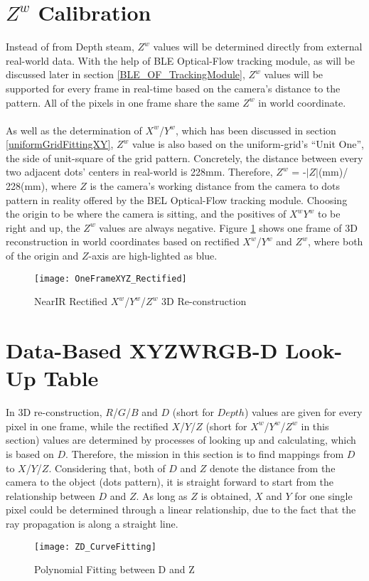 \section{\(Z^{w}\) Calibration}
\label{finalDataBasedModelReconstruction}
%
Instead of from Depth steam, \(Z^{w}\) values will be determined directly from external real-world data. With the help of BLE Optical-Flow tracking module, as will be discussed later in section \ref{BLE_OF_TrackingModule}, \(Z^{w}\) values will be supported for every frame in real-time based on the camera's distance to the pattern. All of the pixels in one frame share the same \(Z^{w}\) in world coordinate.%
\\\\%
As well as the determination of \(X^{w}\)/\(Y^{w}\), which has been discussed in section \ref{uniformGridFittingXY},  \(Z^{w}\) value is also based on the uniform-grid's \enquote{Unit One},  the side of unit-square of the grid pattern. Concretely, the distance between every two adjacent dots' centers in real-world is 228mm. Therefore, \(Z^{w}\) = -\(|Z|\)(mm)/ 228(mm), where \(Z\) is the camera's working distance from the camera to dots pattern in reality offered by the BEL Optical-Flow tracking module. Choosing the origin to be where the camera is sitting, and the positives of \(X^{w}\)\(Y^{w}\) to be right and up, the \(Z^{w}\) values are always negative. Figure \ref{OneFrameXYZ_Rectified} shows one frame of 3D reconstruction in world coordinates based on rectified \(X^{w}\)/\(Y^{w}\) and \(Z^{w}\), where both of the origin and \(Z\)-axis are high-lighted as blue.%
%
\begin{figure}[h]
\centering
\texttt{[image: OneFrameXYZ\_Rectified]}
\caption{NearIR Rectified \(X^{w}\)/\(Y^{w}\)/\(Z^{w}\) 3D Re-construction}
\label{OneFrameXYZ_Rectified}
\end{figure}%
%
\section{Data-Based XYZWRGB-D Look-Up Table}
In 3D re-construction, \(R\)/\(G\)/\(B\) and \(D\) (short for \(Depth\)) values are given for every pixel in one frame, while the rectified \(X\)/\(Y\)/\(Z\) (short for \(X^{w}\)/\(Y^{w}\)/\(Z^{w}\) in this section) values are determined by processes of looking up and calculating, which is based on \(D\). Therefore, the mission in this section is to find mappings from \(D\) to \(X\)/\(Y\)/\(Z\). Considering that, both of \(D\) and \(Z\) denote the distance from the camera to the object (dots pattern), it is straight forward to start from the relationship between \(D\) and \(Z\). As long as \(Z\) is obtained, \(X\) and \(Y\) for one single pixel could be determined through a linear relationship, due to the fact that the ray propagation is along a straight line.\\%
%
\begin{figure}[h]
\centering
\texttt{[image: ZD\_CurveFitting]}
\caption{Polynomial Fitting between D and Z}
\label{ZD_CurveFitting}
\end{figure}%
%
%

